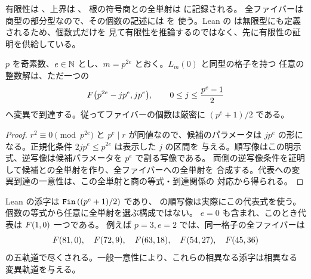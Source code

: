 有限性は 、上界は 、
根の符号商との全単射は  に記録される。
全ファイバーは商型の部分型なので、その個数の記述には  を
使う。Lean の  は無限型にも定義されるため、個数式だけを
見て有限性を推論するのではなく、先に有限性の証明を供給している。

\begin{theorem}[奇素数平方冪における明示的な全代表]
\label{bp:fiber-prime-square}
\leanok
{}
$p$ を奇素数、$e\in\mathbb N$ とし、$m=p^{2e}$ とおく。$L_m(0)$ と同型の格子を持つ
任意の整数解は、ただ一つの
\[
 F\bigl(p^{2e}-jp^e,jp^e\bigr),
 \qquad 0\le j\le\frac{p^e-1}{2}
\]
へ変異で到達する。従ってファイバーの個数は厳密に $(p^e+1)/2$ である。
\end{theorem}
\begin{proof}
\leanok
$r^2\equiv0\pmod{p^{2e}}$ と $p^e\mid r$ が同値なので、候補のパラメータは
$jp^e$ の形になる。正規化条件 $2jp^e\le p^{2e}$ は表示した $j$ の区間を
与える。順写像はこの明示式、逆写像は候補パラメータを $p^e$ で割る写像である。
両側の逆写像条件を証明して候補との全単射を作り、全ファイバーへの全単射を
合成する。代表への変異到達の一意性は、この全単射と商の等式・到達関係の
対応から得られる。
\end{proof}

Lean の添字は $\texttt{Fin}\,((p^e+1)/2)$ であり、
 の順写像は実際にこの代表式を使う。
個数の等式から任意に全単射を選ぶ構成ではない。
$e=0$ も含まれ、このとき代表は $F(1,0)$ 一つである。
例えば $p=3,e=2$ では、同一格子の全ファイバーは
\[
 F(81,0),\quad F(72,9),\quad F(63,18),\quad
 F(54,27),\quad F(45,36)
\]
の五軌道で尽くされる。一般一意性により、これらの相異なる添字は相異なる
変異軌道を与える。

